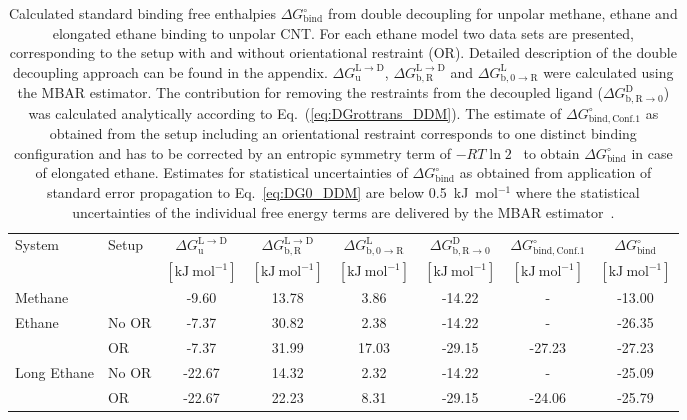 \documentclass[9pt,lessons,pubversion]{livecoms}
\begin{document}
\begin{table}[htb!]
\caption{\label{tbl:DDM} 
Calculated standard binding free enthalpies $\Delta G^\circ_\mathrm{bind}$ from  double decoupling for unpolar methane, ethane and elongated ethane binding to unpolar CNT.
For each ethane model two data sets are presented, corresponding to the setup with and without orientational restraint (OR).
Detailed description of the double decoupling approach can be found in the appendix.
$\Delta G^\mathrm{L \rightarrow D}_\mathrm{u}$, $\Delta G^\mathrm{L \rightarrow D}_\mathrm{b, R}$ and $\Delta G^\mathrm{L}_\mathrm{b, 0 \rightarrow R}$ were calculated using the MBAR estimator.
The contribution for removing the restraints from the decoupled ligand ($\Delta G^\mathrm{D}_\mathrm{b, R \rightarrow 0}$) was calculated analytically according to Eq.~(\ref{eq:DGrottrans_DDM}).
The estimate of $\Delta G^\circ_\mathrm{bind, Conf. 1}$ as obtained from the setup including an orientational restraint corresponds to one distinct binding configuration and has to be corrected 
by an entropic symmetry term of $-RT \ln 2$~\cite{gilson2013correction, hermans1997inclusion} to obtain $\Delta G^\circ_\mathrm{bind}$ in case of elongated ethane.
Estimates for statistical uncertainties of $\Delta G^\circ_\mathrm{bind}$ as obtained from application of standard error propagation to Eq.~\ref{eq:DG0_DDM} are below 0.5~kJ~mol$^{-1}$ where 
the statistical uncertainties of the individual free energy terms are delivered by the MBAR estimator~\cite{shirts2008statistically}.
}
\centering
\begin{tabular}{llc ccc cc}\hline
System & Setup & $\Delta G^\mathrm{L \rightarrow D}_\mathrm{u}$ & $\Delta G^\mathrm{L \rightarrow D}_\mathrm{b, R}$ & $\Delta G^\mathrm{L}_\mathrm{b, 0 \rightarrow R}$ & 
$\Delta G^\mathrm{D}_\mathrm{b, R \rightarrow 0}$ & $\Delta G^\circ_\mathrm{bind, Conf. 1}$ & $\Delta G^\circ_\mathrm{bind}$ \\
& & $[\mathrm{kJ~mol}^{-1}]$ & $[\mathrm{kJ~mol}^{-1}]$ & $[\mathrm{kJ~mol}^{-1}]$ & $[\mathrm{kJ~mol}^{-1}]$ & $[\mathrm{kJ~mol}^{-1}]$ & $[\mathrm{kJ~mol}^{-1}]$ \\ 
\hline
Methane 						& & -9.60	& 13.78	& 3.86 & -14.22 & - & -13.00 \\
\hline
\multirow{ 2}{*}{Ethane}  	& No OR & -7.37 & 30.82 & 2.38 & -14.22 & - & -26.35 \\
					& OR       & -7.37 & 31.99 & 17.03 & -29.15 & -27.23 & -27.23 \\
\hline
\multirow{ 2}{*}{Long Ethane}  & No OR & -22.67 & 14.32 & 2.32 & -14.22 & - & -25.09\\  
					      & OR       & -22.67 & 22.23 & 8.31 & -29.15 & -24.06 & -25.79\\
\hline
\end{tabular}
\end{table}
\end{document}
